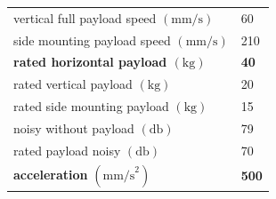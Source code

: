 \begin{figure}[H]
\begin{minipage}[b]{.45\linewidth}
{\begin{tabular}{l|l}
            vertical full payload speed $(\mathrm{mm/s})$     & 60                                     \\
            side mounting payload speed $(\mathrm{mm/s})$     & 210                                    \\
            \textbf{rated horizontal payload $(\mathrm{kg})$}          & \textbf{40}                                     \\
            rated vertical payload $(\mathrm{kg})$            & 20                                     \\
            rated side mounting payload $(\mathrm{kg})$       & 15                                     \\
            noisy without payload $(\mathrm{db})$             & 79                                     \\
            rated payload noisy $(\mathrm{db})$               & 70                                     \\
            \textbf{acceleration } $(\mathrm{mm/s}^{2})$   & \textbf{500}                                    \\ \hline
        \end{tabular}}%
        \label{Specification of Linear Actuator}
    \end{minipage}
\end{figure}

